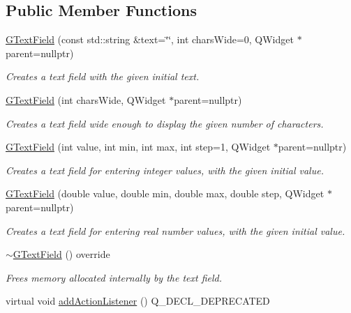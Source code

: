 \subsection*{Public Member Functions}
\begin{DoxyCompactItemize}
\item 
\mbox{\hyperlink{classGTextField_aab905bd4d32eef20c4b8ed701a8ec97f}{G\+Text\+Field}} (const std\+::string \&text=\char`\"{}\char`\"{}, int chars\+Wide=0, Q\+Widget $\ast$parent=nullptr)
\begin{DoxyCompactList}\small\item\em Creates a text field with the given initial text. \end{DoxyCompactList}\item 
\mbox{\hyperlink{classGTextField_a036419be062e4f447008a78dae22921c}{G\+Text\+Field}} (int chars\+Wide, Q\+Widget $\ast$parent=nullptr)
\begin{DoxyCompactList}\small\item\em Creates a text field wide enough to display the given number of characters. \end{DoxyCompactList}\item 
\mbox{\hyperlink{classGTextField_a4caf2f90e21e32abf032c99a8c3f8efb}{G\+Text\+Field}} (int value, int min, int max, int step=1, Q\+Widget $\ast$parent=nullptr)
\begin{DoxyCompactList}\small\item\em Creates a text field for entering integer values, with the given initial value. \end{DoxyCompactList}\item 
\mbox{\hyperlink{classGTextField_a8d164bf18d4dd4da6d5af0d23ee3a2c8}{G\+Text\+Field}} (double value, double min, double max, double step, Q\+Widget $\ast$parent=nullptr)
\begin{DoxyCompactList}\small\item\em Creates a text field for entering real number values, with the given initial value. \end{DoxyCompactList}\item 
\mbox{\hyperlink{classGTextField_a3361f8538c9bd9337a7ccc533d3534c0}{$\sim$\+G\+Text\+Field}} () override
\begin{DoxyCompactList}\small\item\em Frees memory allocated internally by the text field. \end{DoxyCompactList}\item 
virtual void \mbox{\hyperlink{classGInteractor_a02f20ea6edfa0671f31c4c648a253833}{add\+Action\+Listener}} () Q\+\_\+\+D\+E\+C\+L\+\_\+\+D\+E\+P\+R\+E\+C\+A\+T\+ED

\end{DoxyCompactItemize}
